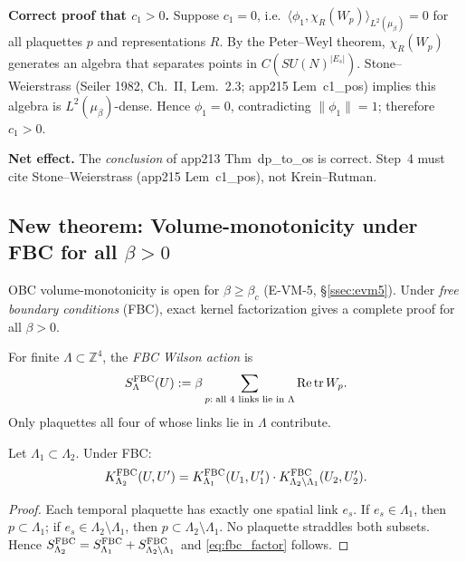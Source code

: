 \textbf{Correct proof that $c_1>0$.}
Suppose $c_1=0$, i.e.\ 
$\langle\phi_1,\chi_R(W_p)\rangle_{L^2(\mu_\beta)}=0$
for all plaquettes $p$ and representations $R$.
By the Peter--Weyl theorem, ${\chi_R(W_p)}$ generates an algebra
that separates points in $C(SU(N)^{|E_s|})$.
Stone--Weierstrass (Seiler 1982, Ch.~II, Lem.~2.3; app215 Lem~c1\_pos)
implies this algebra is $L^2(\mu_\beta)$-dense.
Hence $\phi_1=0$, contradicting $\|\phi_1\|=1$; therefore $c_1>0$.

\medskip
\noindent\textbf{Net effect.}
The \emph{conclusion} of app213 Thm~dp\_to\_os is correct.
Step~4 must cite Stone--Weierstrass (app215 Lem~c1\_pos), not Krein--Rutman.

\subsection{New theorem: Volume-monotonicity under FBC for all $\beta>0$}
\label{ssec:vm_fbc}

OBC volume-monotonicity is open for $\beta\ge\beta_c$ (E-VM-5, \S\ref{ssec:evm5}).
Under \emph{free boundary conditions} (FBC), exact kernel factorization
gives a complete proof for all $\beta>0$.

\begin{definition}
\label{def:fbc}
For finite $\Lambda\subset\mathbb{Z}^4$, the \emph{FBC Wilson action} is
\[
  S^{\rm FBC}_{\Lambda}(U)
  :=\beta\sum_{p:\;\text{all 4 links lie in }\Lambda}
  \operatorname{Re}\operatorname{tr}W_p.
\]
Only plaquettes all four of whose links lie in $\Lambda$ contribute.
\end{definition}

\begin{lemma}
\label{lem:fbc_factor}
Let $\Lambda_1\subset\Lambda_2$. Under FBC:
\begin{equation}\label{eq:fbc_factor}
  K_{\Lambda_2}^{\rm FBC}(U,U')
  = K_{\Lambda_1}^{\rm FBC}(U_1,U_1')
  \cdot K_{\Lambda_2\setminus\Lambda_1}^{\rm FBC}(U_2,U_2').
\end{equation}
\end{lemma}
\begin{proof}
Each temporal plaquette has exactly one spatial link $e_s$.
If $e_s\in\Lambda_1$, then $p\subset\Lambda_1$;
if $e_s\in\Lambda_2\setminus\Lambda_1$, then $p\subset\Lambda_2\setminus\Lambda_1$.
No plaquette straddles both subsets.
Hence $S^{\rm FBC}_{\Lambda_2}=S^{\rm FBC}_{\Lambda_1}+S^{\rm FBC}_{\Lambda_2\setminus\Lambda_1}$
and \eqref{eq:fbc_factor} follows.
\end{proof}

